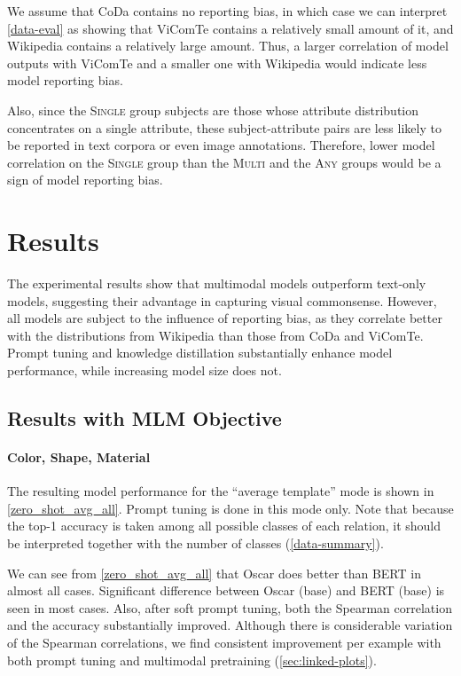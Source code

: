 \documentclass[11pt]{article}
\newcommand{\Single}{{\scshape Single}}
\newcommand{\Multi}{{\scshape Multi}}
\newcommand{\Any}{{\scshape Any}}
\newcommand{\dataset}{ViComTe}
\begin{document}
We assume that CoDa contains no reporting bias, in which case we can interpret \cref{data-eval} as showing that {\dataset} contains a relatively small amount of it, and Wikipedia contains a relatively large amount. Thus, a larger correlation of model outputs with {\dataset} and a smaller one with Wikipedia would indicate less model reporting bias.

Also, since the \Single{} group subjects are those whose attribute distribution concentrates on a single attribute, these subject-attribute pairs are less likely to be reported in text corpora or even image annotations. Therefore, lower model correlation on the \Single{} group than the \Multi{} and the \Any{} groups would be a sign of model reporting bias.

\section{Results}



The experimental results show that multimodal models outperform text-only models, suggesting their advantage in capturing visual commonsense. However, all models are subject to the influence of reporting bias, as they correlate better with the distributions from Wikipedia than those from CoDa and {\dataset}. Prompt tuning and knowledge distillation substantially enhance model performance, while increasing model size does not.

\subsection{Results with MLM Objective}

\paragraph{Color, Shape, Material}

The resulting model performance for the ``average template'' mode is shown in  \cref{zero_shot_avg_all}. Prompt tuning is done in this mode only. Note that because the top-1 accuracy is taken among all possible classes of each relation, it should be interpreted together with the number of classes (\cref{data-summary}).

We can see from \cref{zero_shot_avg_all} that Oscar does better than BERT in almost all cases. Significant difference between Oscar (base) and BERT (base) is seen in most cases.
Also, after soft prompt tuning, both the Spearman correlation and the accuracy substantially improved. 
Although there is considerable variation of the Spearman correlations, we find consistent improvement per example with both prompt tuning and multimodal pretraining (\cref{sec:linked-plots}).
\end{document}
